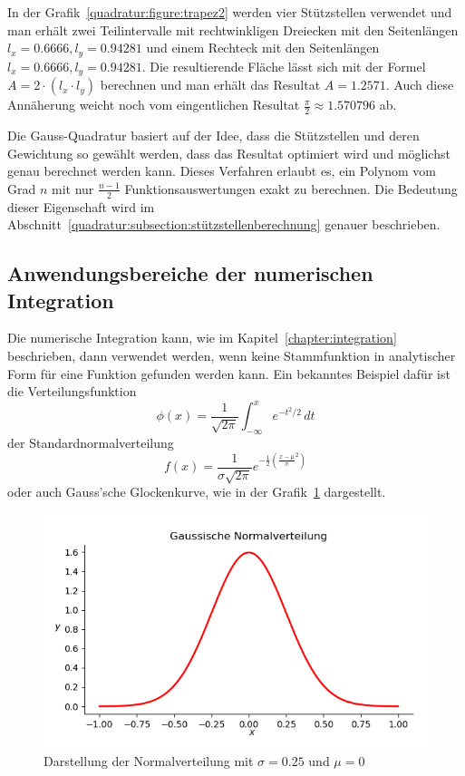\noindent
In der Grafik~\ref{quadratur:figure:trapez2} werden vier Stützstellen verwendet und man erhält zwei Teilintervalle mit 
rechtwinkligen Dreiecken mit den Seitenlängen $l_{x}=0.6666, l_{y}=0.94281$ und einem Rechteck mit den Seitenlängen
$l_{x}=0.6666, l_{y}=0.94281$. 
Die resultierende Fläche lässt sich mit der Formel $A= 2\cdot (l_{x} \cdot l_{y})$ berechnen 
und man erhält das Resultat $A=1.2571$.
Auch diese Annäherung weicht noch vom eingentlichen Resultat $\frac{\pi}{2} \approx 1.570796$ ab.

\noindent
Die Gauss-Quadratur basiert auf der Idee, dass die Stützstellen und deren Gewichtung so gewählt werden,
dass das Resultat optimiert wird und möglichst genau berechnet werden kann.
Dieses Verfahren erlaubt es, ein Polynom vom Grad $n$ mit nur $\frac{n-1}{2}$
Funktionsauswertungen exakt zu berechnen.
\noindent
Die Bedeutung dieser Eigenschaft wird im Abschnitt~\ref{quadratur:subsection:stützstellenberechnung} genauer beschrieben.

\newpage

\subsection{Anwendungsbereiche der numerischen Integration \label{quadratur:subsection:anwendungsbereiche}}
Die numerische Integration kann, wie im Kapitel~\ref{chapter:integration} beschrieben, dann verwendet
werden, wenn keine Stammfunktion in analytischer Form für eine Funktion gefunden werden kann.
Ein bekanntes Beispiel dafür ist die Verteilungsfunktion
\begin{equation}
    \phi(x) 
    =
    \frac{1}{\sqrt{2\pi}}
    \int_{-\infty}^x e^{-t^2/2}\,dt
\end{equation}
\noindent
der Standardnormalverteilung
\begin{equation}
    f(x)
    = 
    \frac{1}{\sigma \sqrt{2\pi}}e^{-\frac{1}{2}(\frac{x-\mu}{\sigma}^{2})}
\end{equation}
\noindent 
oder auch Gauss'sche Glockenkurve, wie in der Grafik~\ref{quadratur:figure:gaussdistribution} dargestellt. 

\begin{figure}[!h]
    \centering
    \includegraphics[scale=0.7]{papers/quadratur/figures/GaussDistribution1}
    \caption{Darstellung der Normalverteilung mit $\sigma=0.25$ und $\mu=0$
    \label{quadratur:figure:gaussdistribution}}
\end{figure}

